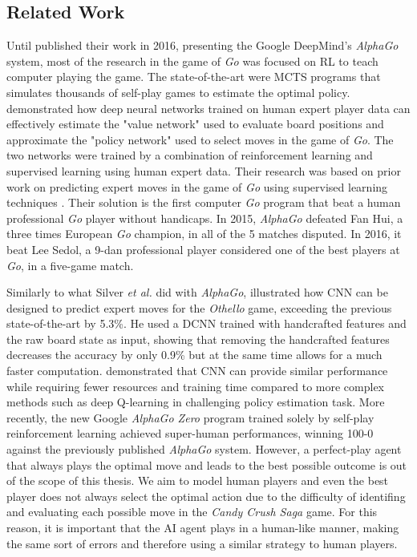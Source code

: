 \subsection{Related Work}
Until \textcite{silver_mastering_2016} published their work in 2016, presenting the Google DeepMind’s \textit{AlphaGo} system, most of the research in the game of \textit{Go} was focused on \acs{RL} to teach computer playing the game. The state-of-the-art were \acs{MCTS} programs that simulates thousands of self-play games to estimate the optimal policy. \textcite{silver_mastering_2016} demonstrated how deep neural networks trained on human expert player data can effectively estimate the "value network" used to evaluate board positions and approximate the "policy network" used to select moves in the game of \textit{Go}. The two networks were trained by a combination of reinforcement learning and supervised learning using human expert data. Their research was based on prior work on predicting expert moves in the game of  \textit{Go} using supervised learning techniques \cite{sutskever_mimicking_2008, stern_bayesian_2006, maddison_move_2014}. Their solution is the first computer \textit{Go} program that beat a human professional \textit{Go} player without handicaps. In 2015, \textit{AlphaGo} defeated Fan Hui, a three times European \textit{Go} champion, in all of the 5 matches disputed. In 2016, it beat Lee Sedol, a 9-dan professional player considered one of the best players at \textit{Go}, in a five-game match. 

Similarly to what Silver \textit{et al.} did with \textit{AlphaGo}, \textcite{hlynur_predicting_2017} illustrated how \acs{CNN} can be designed to predict expert moves for the \textit{Othello} game, exceeding the previous state-of-the-art by 5.3\%. He used a \acs{DCNN} trained with handcrafted features and the raw board state as input, showing that removing the handcrafted features decreases the accuracy by only 0.9\% but at the same time allows for a much faster computation. \textcite{chen_game_2017} demonstrated that \acs{CNN} can provide similar performance while requiring fewer resources and training time compared to more complex methods such as deep Q-learning in challenging policy estimation task. More recently, the new Google \textit{AlphaGo Zero} program \cite{silver_mastering_2017} trained solely by self-play reinforcement learning achieved super-human performances, winning 100-0 against the previously published \textit{AlphaGo} system. However, a perfect-play agent that always plays the optimal move and leads to the best possible outcome is out of the scope of this thesis. We aim to model human players and even the best player does not always select the optimal action due to the difficulty of identifing and evaluating each possible move in the \textit{Candy Crush Saga} game. For this reason, it is important that the \acs{AI} agent plays in a human-like manner, making the same sort of errors and therefore using a similar strategy to human players. 

